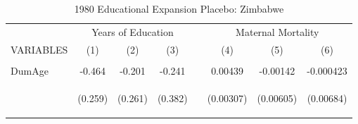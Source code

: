 \begin{subtables}
\begin{landscape}														
\begin{table}[htpb!]														
\begin{center}														
\caption{1980 Educational Expansion Placebo: Zimbabwe}														
\label{MMRtab:ZimbabwePlacebo}														
\begin{tabular}{lcccp{0.3cm}ccc}	\toprule													
& 	\multicolumn{3}{c}{	Years of Education}					& &\multicolumn{3}{c}{	Maternal Mortality }\\	
VARIABLES & 		(1)	&	(2)	&	(3)	&&	(4)	&	(5)	&	(6)	\\ \cline{1-4} \cline{6-8}	
\vspace{4pt}	&	\begin{footnotesize}\end{footnotesize}	&	\begin{footnotesize}\end{footnotesize}	&	\begin{footnotesize}\end{footnotesize}	& \begin{footnotesize}\end{footnotesize} &	\begin{footnotesize}\end{footnotesize}	&	\begin{footnotesize}\end{footnotesize}	&		\begin{footnotesize}\end{footnotesize}	 \\
DumAge  	&	-0.464	&	-0.201	&	-0.241	&&	0.00439	&	-0.00142	&	-0.000423	 \\	
	& \begin{footnotesize}	(0.259)	\end{footnotesize} & \begin{footnotesize}	(0.261)	\end{footnotesize} & \begin{footnotesize}	(0.382)	\end{footnotesize} & \begin{footnotesize}\end{footnotesize} & \begin{footnotesize}	(0.00307)	\end{footnotesize} & \begin{footnotesize}	(0.00605)	\end{footnotesize} & \begin{footnotesize}	(0.00684)	\end{footnotesize} \\	

\end{tabular}
\end{center}
\end{table}
\end{landscape}
\end{subtables}
